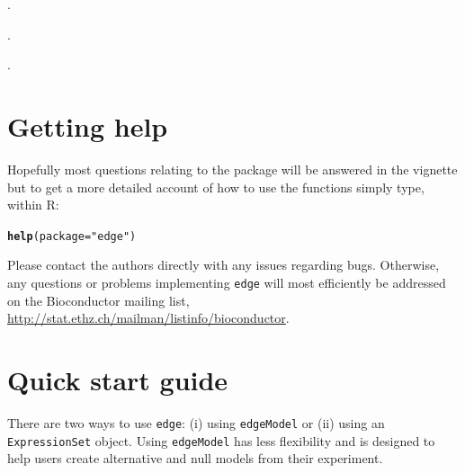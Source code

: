 \documentclass{article}\usepackage[]{graphicx}\usepackage[]{color}
\makeatletter
\newcommand{\hlstr}[1]{\textcolor[rgb]{0.192,0.494,0.8}{#1}}%
\newcommand{\hlstd}[1]{\textcolor[rgb]{0.345,0.345,0.345}{#1}}%
\newcommand{\hlkwc}[1]{\textcolor[rgb]{0.333,0.667,0.333}{#1}}%
\newcommand{\hlkwd}[1]{\textcolor[rgb]{0.737,0.353,0.396}{\textbf{#1}}}%
\newenvironment{kframe}{%
 \def\at@end@of@kframe{}%
 \ifinner\ifhmode%
  \def\at@end@of@kframe{\end{minipage}}%
  \begin{minipage}{\columnwidth}%
 \fi\fi%
 \def\FrameCommand##1{\hskip\@totalleftmargin \hskip-\fboxsep
 \colorbox{shadecolor}{##1}\hskip-\fboxsep
     \hskip-\linewidth \hskip-\@totalleftmargin \hskip\columnwidth}%
 \MakeFramed {\advance\hsize-\width
   \@totalleftmargin\z@ \linewidth\hsize
   \@setminipage}}%
 {\par\unskip\endMakeFramed%
 \at@end@of@kframe}
\newenvironment{knitrout}{}{} %
\makeatother
\begin{document}
.

.

.

\section{Getting help}
Hopefully most questions relating to the package will be answered in the vignette but to get a more detailed account of how to use the functions simply type, within R:
\begin{knitrout}
\color{fgcolor}\begin{kframe}
\begin{alltt}
\hlkwd{help}\hlstd{(}\hlkwc{package} \hlstd{=} \hlstr{"edge"}\hlstd{)}
\end{alltt}
\end{kframe}
\end{knitrout}
\noindent Please contact the authors directly with any issues regarding bugs. Otherwise, any questions or problems implementing {\tt edge} will most efficiently be addressed on the Bioconductor mailing list, \url{http://stat.ethz.ch/mailman/listinfo/bioconductor}.

\section{Quick start guide}
There are two ways to use {\tt edge}: (i) using {\tt edgeModel} or (ii) using an {\tt ExpressionSet} object. Using {\tt edgeModel} has less flexibility and is designed to help users create alternative and null models from their experiment.
\end{document}
